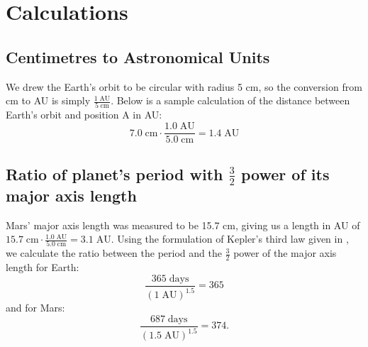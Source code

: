 \documentclass[11pt]{article}
\begin{document}
\section{Calculations}
\subsection*{Centimetres to Astronomical Units}
We drew the Earth's orbit to be circular with radius 5 cm, so the conversion from cm to AU is simply $\frac{1\;\textrm{AU}}{5\;\textrm{cm}}$.
Below is a sample calculation of the distance between Earth's orbit and position A in AU:
\[7.0\;\textrm{cm} \cdot \frac{1.0\;\textrm{AU}}{5.0\;\textrm{cm}} = 1.4\;\textrm{AU}\]

\subsection*{Ratio of planet's period with $\frac{3}{2}$ power of its major axis length}
Mars' major axis length was measured to be 15.7 cm, giving us a length in AU of $15.7\;\textrm{cm} \cdot \frac{1.0\;\textrm{AU}}{5.0\;\textrm{cm}} = 3.1\;\textrm{AU}$.
Using the formulation of Kepler's third law given in \cite{UniPhys}, we calculate the ratio between the period and the $\frac{3}{2}$ power of the major axis length for Earth:
\[\frac{365\;\textrm{days}}{(1\;\textrm{AU})^{1.5}} = 365\]
and for Mars:
\[\frac{687\;\textrm{days}}{(1.5\;\textrm{AU})^{1.5}} = 374.\]
\end{document}
